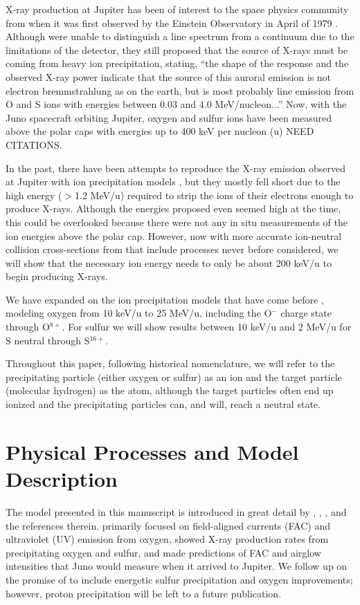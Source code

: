 \documentclass[draft]{agujournal2018}
\begin{document}
X-ray production at Jupiter has been of interest to the space physics community from when it was first observed by the Einstein Observatory in April of 1979 \citep{metzger1983}.
Although \citet{metzger1983} were unable to distinguish a line spectrum from a continuum due to the limitations of the detector, they still proposed that the source of X-rays must be coming from heavy ion precipitation, stating, ``the shape of the response and the observed X-ray power indicate that the source of this auroral emission is not electron bremmstrahlung as on the earth, but is most probably line emission from O and S ions with energies between 0.03 and 4.0 MeV/nucleon...''
Now, with the Juno spacecraft orbiting Jupiter, oxygen and sulfur ions have been measured above the polar caps with energies up to 400 keV per nucleon (u) NEED CITATIONS.

In the past, there have been attempts to reproduce the X-ray emission observed at Jupiter with ion precipitation models \citep{cravens1995,ozak2010,ozak2013}, but they mostly fell short due to the high energy ($>$1.2 MeV/u) required to strip the ions of their electrons enough to produce X-rays.
Although the energies proposed even seemed high at the time, this could be overlooked because there were not any in situ measurements of the ion energies above the polar cap.
However, now with more accurate ion-neutral collision cross-sections from \citet{schultz2018} that include processes never before considered, we will show that the necessary ion energy needs to only be about 200 keV/u to begin producing X-rays.

We have expanded on the ion precipitation models that have come before \citep{cravens1995,ozak2010,ozak2013,houston2018}, modeling oxygen from 10 keV/u to 25 MeV/u, including the O$^-$ charge state through O$^{8+}$.
For sulfur we will show results between 10 keV/u and 2 MeV/u for S neutral through S$^{16+}$.

Throughout this paper, following historical nomenclature, we will refer to the precipitating particle (either oxygen or sulfur) as an ion and the target particle (molecular hydrogen) as the atom, although the target particles often end up ionized and the precipitating particles can, and will, reach a neutral state.

\section{Physical Processes and Model Description}

The model presented in this manuscript is introduced in great detail by \citet{houston2018}, \citet{ozak2010}, \citet{ozak2013}, and the references therein.
\citet{houston2018} primarily focused on field-aligned currents (FAC) and ultraviolet (UV) emission from oxygen, \citet{ozak2010} showed X-ray production rates from precipitating oxygen and sulfur, and \citet{ozak2013} made predictions of FAC and airglow intensities that Juno would measure when it arrived to Jupiter.
We follow up on the promise of \citet{houston2018} to include energetic sulfur precipitation and oxygen improvements; however, proton precipitation will be left to a future publication. 
\end{document}
